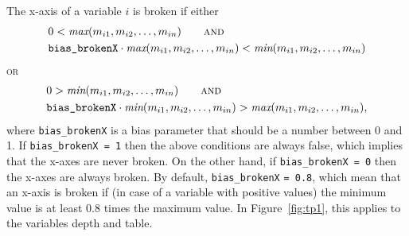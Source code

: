 \documentclass[11pt, fleqn, a4paper]{article}\usepackage[]{graphicx}\usepackage[]{color}
\begin{document}
The x-axis of a variable $i$ is broken if
either
\begin{align*}
& 0 < \textit{max}(m_{i1}, m_{i2},\ldots, m_{in}) \qquad \textsc{and}\\
& \mbox{{\tt bias\_brokenX}} \cdot \textit{max}(m_{i1}, m_{i2},\ldots, m_{in}) < \textit{min}(m_{i1}, m_{i2},\ldots, m_{in}) 
\end{align*}
\textsc{or}
\begin{align*}
& 0 > \textit{min}(m_{i1}, m_{i2},\ldots, m_{in}) \qquad \textsc{and}\\
& \mbox{{\tt bias\_brokenX}} \cdot \textit{min}(m_{i1}, m_{i2},\ldots, m_{in}) > \textit{max}(m_{i1}, m_{i2},\ldots, m_{in}),
\end{align*}
where {\tt bias\_brokenX} is a bias parameter that should be a number between 0 and 1. If {\tt bias\_brokenX = 1} then the above conditions are always false, which implies that the x-axes are never broken. On the other hand, if {\tt bias\_brokenX = 0} then the x-axes are always broken. By default, {\tt bias\_brokenX} {\tt= 0.8}, which mean that an x-axis is broken if (in case of a variable with positive values) the minimum value is at least 0.8 times the maximum value. In Figure~\ref{fig:tp1}, this applies to the variables depth and table.
\end{document}
